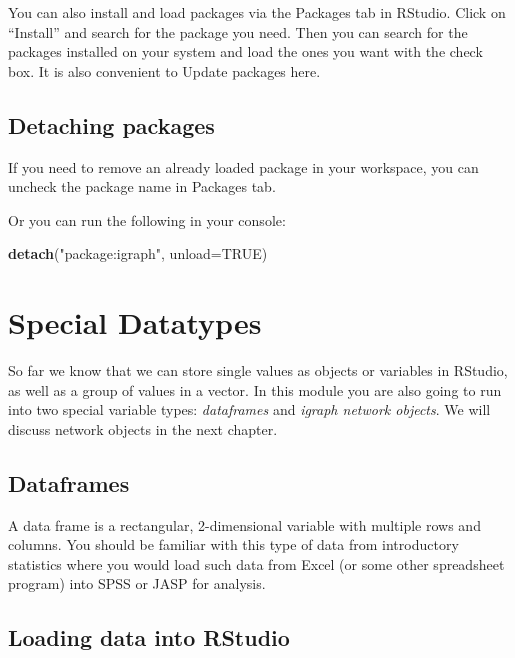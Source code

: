 \documentclass[
]{book}
\newenvironment{Shaded}{\begin{snugshade}}{\end{snugshade}}
\newcommand{\AttributeTok}[1]{\textcolor[rgb]{0.13,0.29,0.53}{#1}}
\newcommand{\ConstantTok}[1]{\textcolor[rgb]{0.56,0.35,0.01}{#1}}
\newcommand{\FunctionTok}[1]{\textcolor[rgb]{0.13,0.29,0.53}{\textbf{#1}}}
\newcommand{\NormalTok}[1]{#1}
\newcommand{\StringTok}[1]{\textcolor[rgb]{0.31,0.60,0.02}{#1}}
\begin{document}
You can also install and load packages via the Packages tab in RStudio. Click on ``Install'' and search for the package you need. Then you can search for the packages installed on your system and load the ones you want with the check box. It is also convenient to Update packages here.

\subsection{Detaching packages}\label{detaching-packages}

If you need to remove an already loaded package in your workspace, you can uncheck the package name in Packages tab.

Or you can run the following in your console:

\begin{Shaded}
\begin{Highlighting}[]
\FunctionTok{detach}\NormalTok{(}\StringTok{"package:igraph"}\NormalTok{, }\AttributeTok{unload=}\ConstantTok{TRUE}\NormalTok{)}
\end{Highlighting}
\end{Shaded}

\section{Special Datatypes}\label{special-datatypes}

So far we know that we can store single values as objects or variables in RStudio, as well as a group of values in a vector. In this module you are also going to run into two special variable types: \emph{dataframes} and \emph{igraph network objects}. We will discuss network objects in the next chapter.

\subsection{Dataframes}\label{dataframes}

A data frame is a rectangular, 2-dimensional variable with multiple rows and columns. You should be familiar with this type of data from introductory statistics where you would load such data from Excel (or some other spreadsheet program) into SPSS or JASP for analysis.

\subsection{Loading data into RStudio}\label{loading-data-into-rstudio}
\end{document}

